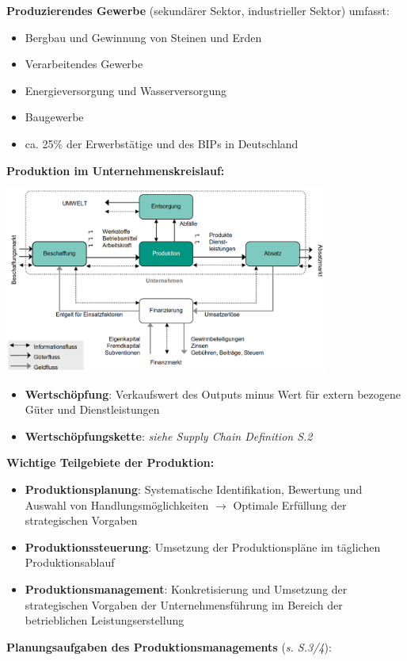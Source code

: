 \textbf{Produzierendes Gewerbe} (sekundärer Sektor, industrieller Sektor) umfasst:
\begin{itemize}
	\item Bergbau und Gewinnung von Steinen und Erden
	\item Verarbeitendes Gewerbe
	\item Energieversorgung und Wasserversorgung
	\item Baugewerbe
	\item ca. 25\% der Erwerbstätige und des BIPs in Deutschland
\end{itemize}
\bigskip
\textbf{Produktion im Unternehmenskreislauf:}
\begin{center}
	\includegraphics[width=0.8\textwidth]{images/production-circuit.png}
\end{center}
\begin{itemize}
	\item \textbf{Wertschöpfung}: Verkaufswert des Outputs minus Wert für extern bezogene Güter und Dienstleistungen
	\item \textbf{Wertschöpfungskette}: \textit{siehe Supply Chain Definition S.2}
\end{itemize}
\pagebreak
\textbf{Wichtige Teilgebiete der Produktion:}
\begin{itemize}
	\item \textbf{Produktionsplanung}: Systematische Identifikation, Bewertung und Auswahl von
	Handlungsmöglichkeiten $\rightarrow$ Optimale Erfüllung der strategischen Vorgaben
	\item \textbf{Produktionssteuerung}: Umsetzung der Produktionspläne im täglichen Produktionsablauf
	\item \textbf{Produktionsmanagement}: Konkretisierung und Umsetzung der strategischen Vorgaben der Unternehmensführung im Bereich der betrieblichen Leistungserstellung
\end{itemize}
\bigskip
\textbf{Planungsaufgaben des Produktionsmanagements} (\textit{s. S.3/4}):
